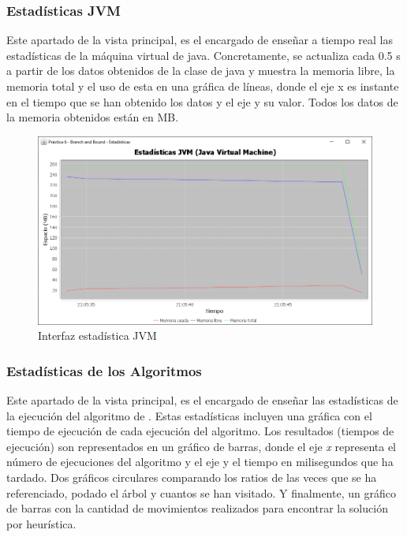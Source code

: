 \subsubsection{Estadísticas JVM}\label{Stats JVM}

Este apartado de la vista principal, es el encargado de enseñar a tiempo real las estadísticas de la máquina virtual de java. Concretamente, se actualiza cada 0.5 s a partir de los datos obtenidos de la clase de java  y muestra la memoria libre, la memoria total y el uso de esta en una gráfica de líneas, donde el eje x es instante en el tiempo que se han obtenido los datos y el eje y su valor. Todos los datos de la memoria obtenidos están en MB.

\begin{figure}[!h]
    \centering
    \includegraphics[width=\linewidth]{MVC/View/img/stats-jvm.png}
    \caption{Interfaz estadística JVM}
    \label{fig:Ejemplo stats JVM}
\end{figure}

\subsubsection{Estadísticas de los Algoritmos}\label{Stats Algt}

Este apartado de la vista principal, es el encargado de enseñar las estadísticas de la ejecución del algoritmo de . Estas estadísticas incluyen una gráfica con el tiempo de ejecución de cada ejecución del algoritmo. Los resultados (tiempos de ejecución) son representados en un gráfico de barras, donde el eje \textit{x} representa el número de ejecuciones del algoritmo y el eje y el tiempo en milisegundos que ha tardado. Dos gráficos circulares comparando los ratios de las veces que se ha referenciado, podado el árbol y cuantos se han visitado. Y finalmente, un gráfico de barras con la cantidad de movimientos realizados para encontrar la solución por heurística.

